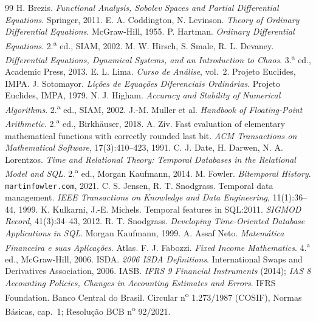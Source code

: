 \documentclass[11pt, a4paper]{article}
\theoremstyle{definition}
\theoremstyle{plain}
\theoremstyle{remark}
\begin{document}
\begin{thebibliography}{99}
 H. Brezis. \emph{Functional Analysis, Sobolev Spaces and Partial Differential Equations}. Springer, 2011.
 E. A. Coddington, N. Levinson. \emph{Theory of Ordinary Differential Equations}. McGraw-Hill, 1955.
 P. Hartman. \emph{Ordinary Differential Equations}. 2.\textsuperscript{a} ed., SIAM, 2002.
 M. W. Hirsch, S. Smale, R. L. Devaney. \emph{Differential Equations, Dynamical Systems, and an Introduction to Chaos}. 3.\textsuperscript{a} ed., Academic Press, 2013.
 E. L. Lima. \emph{Curso de Análise}, vol.\ 2. Projeto Euclides, IMPA.
 J. Sotomayor. \emph{Lições de Equações Diferenciais Ordinárias}. Projeto Euclides, IMPA, 1979.
 N. J. Higham. \emph{Accuracy and Stability of Numerical Algorithms}. 2.\textsuperscript{a} ed., SIAM, 2002.
 J.-M. Muller et al. \emph{Handbook of Floating-Point Arithmetic}. 2.\textsuperscript{a} ed., Birkhäuser, 2018.
 A. Ziv. Fast evaluation of elementary mathematical functions with correctly rounded last bit. \emph{ACM Transactions on Mathematical Software}, 17(3):410--423, 1991.
 C. J. Date, H. Darwen, N. A. Lorentzos. \emph{Time and Relational Theory: Temporal Databases in the Relational Model and SQL}. 2.\textsuperscript{a} ed., Morgan Kaufmann, 2014.
 M. Fowler. \emph{Bitemporal History}. \texttt{martinfowler.com}, 2021.
 C. S. Jensen, R. T. Snodgrass. Temporal data management. \emph{IEEE Transactions on Knowledge and Data Engineering}, 11(1):36--44, 1999.
 K. Kulkarni, J.-E. Michels. Temporal features in SQL:2011. \emph{SIGMOD Record}, 41(3):34--43, 2012.
 R. T. Snodgrass. \emph{Developing Time-Oriented Database Applications in SQL}. Morgan Kaufmann, 1999.
 A. Assaf Neto. \emph{Matemática Financeira e suas Aplicações}. Atlas.
 F. J. Fabozzi. \emph{Fixed Income Mathematics}. 4.\textsuperscript{a} ed., McGraw-Hill, 2006.
 ISDA. \emph{2006 ISDA Definitions}. International Swaps and Derivatives Association, 2006.
 IASB. \emph{IFRS 9 Financial Instruments} (2014); \emph{IAS 8 Accounting Policies, Changes in Accounting Estimates and Errors}. IFRS Foundation.
 Banco Central do Brasil. Circular n\textsuperscript{o} 1.273/1987 (COSIF), Normas Básicas, cap.\ 1; Resolução BCB n\textsuperscript{o} 92/2021.

\end{thebibliography}
\end{document}
